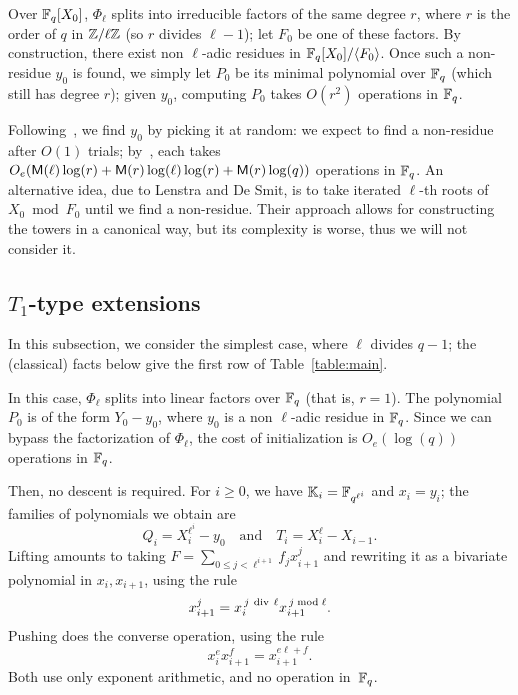 \documentclass{sig-alternate}
\newcommand{\Cyc}{\Phi}  %
\begin{document}
Over $\mathbb{F}_q[X_0]$, $\Cyc_\ell$ splits into irreducible factors of the
same degree $r$, where $r$ is the order of $q$ in $\mathbb{Z}/\ell\mathbb{Z}$ (so $r$
divides $\ell-1$); let $F_0$ be one of these factors. By construction,
there exist non $\ell$-adic residues in $\mathbb{F}_q[X_0]/\langle F_0
\rangle$. Once such a non-residue $y_0$ is found, we simply let $P_0$
be its minimal polynomial over $\mathbb{F}_q$ (which still has degree $r$);
given $y_0$, computing $P_0$ takes $O(r^2)$ operations in $\mathbb{F}_q$.

Following~\cite{Shoup90,shoup94,couveignes+lercier11}, we find $y_0$
by picking it at random: we expect to find a non-residue after $O(1)$
trials; by~\cite[Lemma~15]{shoup94}, each takes
$O_e(\mathsf{M}(\ell)\log(r)+\mathsf{M}(r)\log(\ell)\log(r)+\mathsf{M}(r)\log(q))$
operations in $\mathbb{F}_q$. An alternative idea, due to Lenstra and De Smit,
is to take iterated $\ell$-th roots of $X_0 \bmod F_0$ until we find a
non-residue.  Their approach allows for constructing the towers in a
canonical way, but its complexity is worse, thus we will not consider
it.


\subsection{$T_1$-type extensions}\label{ssec:T1}

In this subsection, we consider the simplest case, where $\ell$
divides $q-1$; the (classical) facts below give the first row of
Table~\ref{table:main}.

In this case, $\Phi_\ell$ splits into linear factors over $\mathbb{F}_q$ (that
is, $r=1$). The polynomial $P_0$ is of the form $Y_0-y_0$, where
$y_0$ is a non $\ell$-adic residue in $\mathbb{F}_q$.  Since we can bypass
the factorization of $\Phi_\ell$, the cost of initialization is
$O_e(\log(q))$ operations in $\mathbb{F}_q$.

Then, no descent is required. For $i \ge 0$, we have
$\mathbb{K}_i=\mathbb{F}_{q^{\ell^i}}$ and $x_i=y_i$; the families of polynomials we
obtain are
\begin{equation}
  \label{eq:T1}
  Q_i=X_i^{\ell^i}-y_0 \quad\text{and}\quad T_i=X_{i}^\ell-X_{i-1}.
\end{equation}
Lifting amounts to taking $F = \sum_{0 \le j < \ell^{i+1}} f_j
x_{i+1}^j$ and rewriting it as a bivariate polynomial in
$x_i,x_{i+1}$, using the rule
$$x_{i+1}^j = x_i^{\,j {\rm~div~} \ell} x_{i+1}^{\,j \bmod \ell}.$$
Pushing does the converse operation, using the rule
$$x_i^e x_{i+1}^f = x_{i+1}^{e \ell + f}.$$ Both 
use only exponent arithmetic, and no operation in~$\mathbb{F}_q$. 
\end{document}
